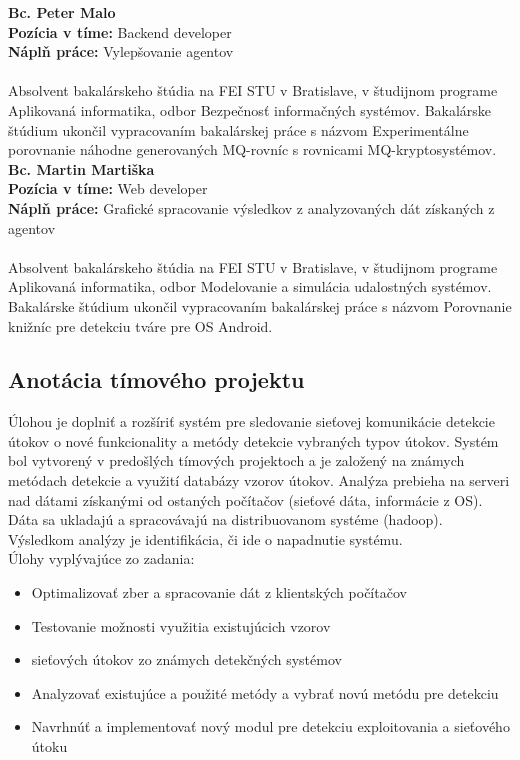 \documentclass[a4paper,12pt]{article}
\begin{document}
\noindent \textbf{Bc. Peter Malo} \\
\textbf{Pozícia v tíme: } Backend developer \\ 
\textbf{Náplň práce:} Vylepšovanie agentov \\ \\
Absolvent bakalárskeho štúdia na FEI STU v Bratislave, v študijnom programe Aplikovaná informatika, odbor Bezpečnosť informačných systémov. Bakalárske štúdium ukončil vypracovaním bakalárskej práce s názvom Experimentálne porovnanie náhodne generovaných MQ-rovníc s rovnicami MQ-kryptosystémov. \\ 

\noindent \textbf{Bc. Martin Martiška} \\
\textbf{Pozícia v tíme: } Web developer \\ 
\textbf{Náplň práce:} Grafické spracovanie výsledkov z analyzovaných dát získaných z agentov \\ \\
Absolvent bakalárskeho štúdia na FEI STU v Bratislave, v študijnom programe Aplikovaná informatika, odbor Modelovanie a simulácia udalostných systémov. Bakalárske štúdium ukončil vypracovaním bakalárskej práce s názvom Porovnanie knižníc pre detekciu tváre pre OS Android. \\ 

\subsection{Anotácia tímového projektu}
Úlohou je doplniť a rozšíriť systém pre sledovanie sieťovej komunikácie detekcie útokov o nové funkcionality a metódy detekcie vybraných typov útokov. Systém bol vytvorený v predošlých tímových projektoch a je založený na známych metódach detekcie a využití databázy vzorov útokov. Analýza prebieha na serveri nad dátami získanými od ostaných počítačov (sieťové dáta, informácie z OS). Dáta sa ukladajú a spracovávajú na distribuovanom systéme (hadoop). Výsledkom analýzy je identifikácia, či ide o napadnutie systému. \\

Úlohy vyplývajúce zo zadania: 
\begin{itemize}
	\item Optimalizovať zber a spracovanie dát z klientských počítačov 
	\item Testovanie možnosti využitia existujúcich vzorov  \item sieťových útokov zo známych detekčných systémov 
	\item Analyzovať existujúce a použité metódy a vybrať novú metódu pre detekciu 
	\item Navrhnúť a implementovať nový modul pre detekciu exploitovania a sieťového útoku \\
\end{itemize}
\end{document}
